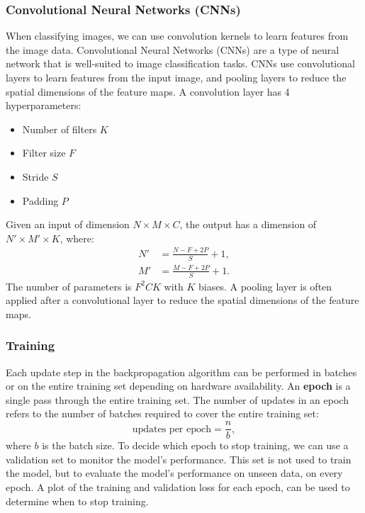 \documentclass{article}
\begin{document}
\subsubsection{Convolutional Neural Networks (CNNs)}
When classifying images, we can use convolution kernels to learn
features from the image data. Convolutional Neural Networks (CNNs) are
a type of neural network that is well-suited to image classification
tasks. CNNs use convolutional layers to learn features from the input
image, and pooling layers to reduce the spatial dimensions of the
feature maps. A convolution layer has 4 hyperparameters:
\begin{itemize}
    \item Number of filters \(K\)
    \item Filter size \(F\)
    \item Stride \(S\)
    \item Padding \(P\)
\end{itemize}
Given an input of dimension \(N \times M \times C\), the output has a
dimension of \(N' \times M' \times K\), where:
\begin{align*}
    N' & = \frac{N - F + 2P}{S} + 1, \\
    M' & = \frac{M - F + 2P}{S} + 1.
\end{align*}
The number of parameters is \(F^2 CK\) with \(K\) biases. A pooling
layer is often applied after a convolutional layer to reduce the spatial
dimensions of the feature maps.
\subsubsection{Training}
Each update step in the backpropagation algorithm can be performed in
batches or on the entire training set depending on hardware
availability. An \textbf{epoch} is a single pass through the entire
training set. The number of updates in an epoch refers to the number of
batches required to cover the entire training set:
\begin{equation*}
    \text{updates per epoch} = \frac{n}{b},
\end{equation*}
where \(b\) is the batch size. To decide which epoch to stop training,
we can use a validation set to monitor the model's performance. This set
is not used to train the model, but to evaluate the model's performance
on unseen data, on every epoch. A plot of the training and validation
loss for each epoch, can be used to determine when to stop training.
\end{document}
